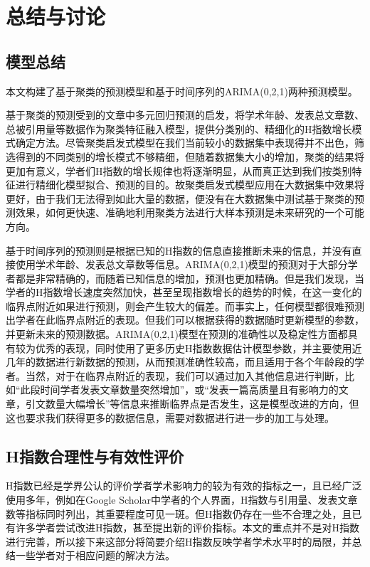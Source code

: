 \documentclass[lang=cn,11pt,a4paper,cite=authoryear]{elegantpaper}
\begin{document}
\section{总结与讨论}

\subsection{模型总结}

本文构建了基于聚类的预测模型和基于时间序列的ARIMA(0,2,1)两种预测模型。

基于聚类的预测受到\cite{7397965}的文章中多元回归预测的启发，将学术年龄、发表总文章数、总被引用量等数据作为聚类特征融入模型，提供分类别的、精细化的H指数增长模式确定方法。尽管聚类启发式模型在我们当前较小的数据集中表现得并不出色，筛选得到的不同类别的增长模式不够精细，但随着数据集大小的增加，聚类的结果将更加有意义，学者们H指数的增长规律也将逐渐明显，从而真正达到我们按类别特征进行精细化模型拟合、预测的目的。故聚类启发式模型应用在大数据集中效果将更好，由于我们无法得到如此大量的数据，便没有在大数据集中测试基于聚类的预测效果，如何更快速、准确地利用聚类方法进行大样本预测是未来研究的一个可能方向。

基于时间序列的预测则是根据已知的H指数的信息直接推断未来的信息，并没有直接使用学术年龄、发表总文章数等信息。ARIMA(0,2,1)模型的预测对于大部分学者都是非常精确的，而随着已知信息的增加，预测也更加精确。但是我们发现，当学者的H指数增长速度突然加快，甚至呈现指数增长的趋势的时候，在这一变化的临界点附近如果进行预测，则会产生较大的偏差。而事实上，任何模型都很难预测出学者在此临界点附近的表现。但我们可以根据获得的数据随时更新模型的参数，并更新未来的预测数据。ARIMA(0,2,1)模型在预测的准确性以及稳定性方面都具有较为优秀的表现，同时使用了更多历史H指数数据估计模型参数，并主要使用近几年的数据进行新数据的预测，从而预测准确性较高，而且适用于各个年龄段的学者。当然，对于在临界点附近的表现，我们可以通过加入其他信息进行判断，比如“此段时间学者发表文章数量突然增加”，或“发表一篇高质量且有影响力的文章，引文数量大幅增长”等信息来推断临界点是否发生，这是模型改进的方向，但这也要求我们获得更多的数据信息，需要对数据进行进一步的加工与处理。

\subsection{H指数合理性与有效性评价}

H指数已经是学界公认的评价学者学术影响力的较为有效的指标之一，且已经广泛使用多年，例如在Google Scholar中学者的个人界面，H指数与引用量、发表文章数等指标同时列出，其重要程度可见一斑。但H指数仍存在一些不合理之处，且已有许多学者尝试改进H指数，甚至提出新的评价指标。本文的重点并不是对H指数进行完善，所以接下来这部分将简要介绍H指数反映学者学术水平时的局限，并总结一些学者对于相应问题的解决方法。
\end{document}
